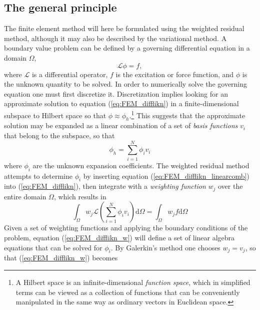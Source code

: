 \subsection{The general principle}
\label{sec:FEM_generalprinciple}
The finite element method will here be formulated using the weighted residual method, although it may also be described by the variational method\cite{FEM_in_EM_jianming_jin}. A boundary value problem can be defined by a governing differential equation in a domain $\Omega$,
\begin{equation}
    \mathcal{L}\phi = f,
    \label{eq:FEM_difflikn}
\end{equation}
where $\mathcal{L}$ is a differential operator, $f$ is the excitation or force function, and $\phi$ is the unknown quantity to be solved. In order to numerically solve the governing equation one must first discretize it. Discretization implies looking for an approximate solution to equation (\ref{eq:FEM_difflikn}) in a finite-dimensional subspace to Hilbert space so that $\phi\approx\phi_h$.\footnote{A Hilbert space is an infinite-dimensional \emph{function space}, which in simplified terms can be viewed as a collection of functions that can be conveniently manipulated in the same way as ordinary vectors in Euclidean space.} This suggests that the approximate solution may be expanded as a linear combination of a set of \emph{basis functions} $v_i$ that belong to the subspace, so that\cite{FEM_comsol}
\begin{equation}
    \phi_h = \sum_{i=1}^N \phi_i v_i
    \label{eq:FEM_difflikn_linearcomb}
\end{equation}
where $\phi_i$ are the unknown expansion coefficients. The weighted residual method attempts to determine $\phi_i$ by inserting equation (\ref{eq:FEM_difflikn_linearcomb}) into (\ref{eq:FEM_difflikn}), then integrate with a \emph{weighting function} $w_j$ over the entire domain $\Omega$, which results in\cite{FEM_TheoryAndCompOfEM_Jian-Ming_Jin}
\begin{equation}
    \int_\Omega w_j \mathcal{L} \left( \sum_{i=1}^N \phi_i v_i \right) \text{d}\Omega = \int_\Omega w_j f \text{d}\Omega
    \label{eq:FEM_difflikn_w}
\end{equation}
Given a set of weighting functions and applying the boundary conditions of the problem, equation (\ref{eq:FEM_difflikn_w}) will define a set of linear algebra equations that can be solved for $\phi_i$. By Galerkin's method\cite{FEM_in_EM_jianming_jin} one chooses $w_j = v_j$, so that (\ref{eq:FEM_difflikn_w}) becomes 
